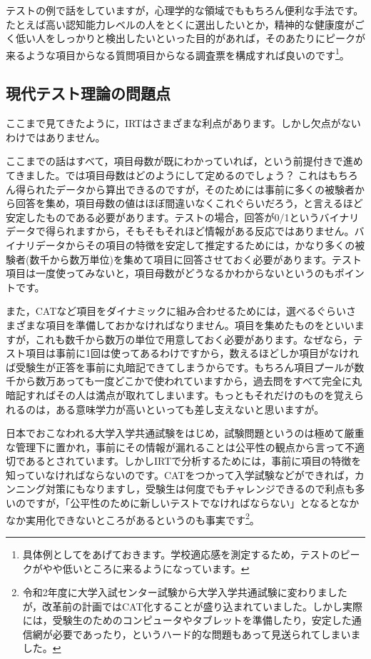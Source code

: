 \documentclass{ltjsbook}
\begin{document}
テストの例で話をしていますが，心理学的な領域でももちろん便利な手法です。たとえば高い認知能力レベルの人をとくに選出したいとか，精神的な健康度がごく低い人をしっかりと検出したいといった目的があれば，そのあたりにピークが来るような項目からなる質問項目からなる調査票を構成すれば良いのです\footnote{具体例として\citet{kosugi120005596041}をあげておきます。学校適応感を測定するため，テストのピークがやや低いところに来るようになっています。}。


\subsection{現代テスト理論の問題点}
ここまで見てきたように，IRTはさまざまな利点があります。しかし欠点がないわけではありません。

ここまでの話はすべて，項目母数が既にわかっていれば，という前提付きで進めてきました。では項目母数はどのようにして定めるのでしょう？ これはもちろん得られたデータから算出できるのですが，そのためには事前に多くの被験者から回答を集め，項目母数の値はほぼ間違いなくこれぐらいだろう，と言えるほど安定したものである必要があります。テストの場合，回答が0/1というバイナリデータで得られますから，そもそもそれほど情報がある反応ではありません。バイナリデータからその項目の特徴を安定して推定するためには，かなり多くの被験者(数千から数万単位)を集めて項目に回答させておく必要があります。テスト項目は一度使ってみないと，項目母数がどうなるかわからないというのもポイントです。

また，CATなど項目をダイナミックに組み合わせるためには，選べるぐらいさまざまな項目を準備しておかなければなりません。項目を集めたものをといいますが，これも数千から数万の単位で用意しておく必要があります。なぜなら，テスト項目は事前に1回は使ってあるわけですから，数えるほどしか項目がなければ受験生が正答を事前に丸暗記できてしまうからです。もちろん項目プールが数千から数万あっても一度どこかで使われていますから，過去問をすべて完全に丸暗記すればその人は満点が取れてしまいます。もっともそれだけのものを覚えられるのは，ある意味学力が高いといっても差し支えないと思いますが。

日本でおこなわれる大学入学共通試験をはじめ，試験問題というのは極めて厳重な管理下に置かれ，事前にその情報が漏れることは公平性の観点から言って不適切であるとされています。しかしIRTで分析するためには，事前に項目の特徴を知っていなければならないのです。CATをつかって入学試験などができれば，カンニング対策にもなりますし，受験生は何度でもチャレンジできるので利点も多いのですが，「公平性のために新しいテストでなければならない」となるとなかなか実用化できないところがあるというのも事実です\footnote{令和2年度に大学入試センター試験から大学入学共通試験に変わりましたが，改革前の計画ではCAT化することが盛り込まれていました。しかし実際には，受験生のためのコンピュータやタブレットを準備したり，安定した通信網が必要であったり，というハード的な問題もあって見送られてしまいました。}。
\end{document}
